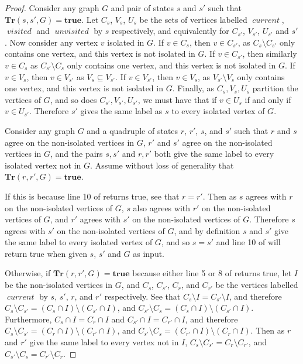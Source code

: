 \documentclass[a4paper,UKenglish,cleveref, autoref, thm-restate]{lipics-v2021} %
\DeclareMathOperator{\visited}{\textit{visited}}
\DeclareMathOperator{\unvisited}{\textit{unvisited}}
\DeclareMathOperator{\current}{\textit{current}}
\begin{document}
\begin{toappendix}
\begin{proof}
    Consider any graph $G$ and pair of states $s$ and $s'$ such that $\textbf{Tr}(s, s', G)=\textbf{true}$. Let $C_s$, $V_s$, $U_s$ be the sets of vertices labelled $\current$, $\visited$ and $\unvisited$ by $s$ respectively, and equivalently for $C_{s'}$, $V_{s'}$, $U_{s'}$ and $s'$. Now consider any vertex $v$ isolated in $G$. If $v \in C_s$, then $v \in C_{s'}$, as $C_s \setminus C_{s'}$ only contains one vertex, and this vertex is not isolated in $G$. If $v \in C_{s'}$, then similarly $v \in C_s$ as $C_{s'} \setminus C_s$ only contains one vertex, and this vertex is not isolated in $G$. If $v \in V_s$, then $v \in V_{s'}$ as $V_s \subseteq V_{s'}$. If $v \in V_{s'}$, then $v \in V_s$, as $V_{s'} \setminus V_s$ only contains one vertex, and this vertex is not isolated in $G$. Finally, as $C_s, V_s, U_s$ partition the vertices of $G$, and so does $C_{s'}, V_{s'}, U_{s'}$, we must have that if $v \in U_s$ if and only if $v \in U_{s'}$. Therefore $s'$ gives the same label as $s$ to every isolated vertex of $G$.

    Consider any graph $G$ and a quadruple of states $r$, $r'$, $s$, and $s'$ such that $r$ and $s$ agree on the non-isolated vertices in $G$, $r'$ and $s'$ agree on the non-isolated vertices in $G$, and the pairs $s,s'$ and $r,r'$ both give the same label to every isolated vertex not in $G$. Assume without loss of generality that $\textbf{Tr}(r, r', G)=\textbf{true}$.
    
    If this is because line 10 of  returns true, see that $r=r'$. Then as $s$ agrees with $r$ on the non-isolated vertices of $G$, $s$ also agrees with $r'$ on the non-isolated vertices of $G$, and $r'$ agrees with $s'$ on the non-isolated vertices of $G$. Therefore $s$ agrees with $s'$ on the non-isolated vertices of $G$, and by definition $s$ and $s'$ give the same label to every isolated vertex of $G$, and so $s=s'$ and line 10 of  will return true when given $s$, $s'$ and $G$ as input.
    
    Otherwise, if $\textbf{Tr}(r, r', G)=\textbf{true}$ because either line 5 or 8 of  returns true, let $I$ be the non-isolated vertices in $G$, and $C_s$, $C_{s'}$, $C_r$, and $C_{r'}$ be the vertices labelled $\current$ by $s$, $s'$, $r$, and $r'$ respectively. See that $C_s \setminus I = C_{s'} \setminus I$, and therefore $C_s \setminus C_{s'} = (C_s \cap I) \setminus (C_{s'} \cap I)$, and $C_{s'} \setminus C_s = (C_s \cap I) \setminus (C_{s'} \cap I)$. Furthermore, $C_s \cap I = C_r \cap I$ and $C_{s'} \cap I = C_{r'} \cap I$, and therefore $C_s \setminus C_{s'} = (C_r \cap I) \setminus (C_{r'} \cap I)$, and $C_{s'} \setminus C_{s} = (C_{r'} \cap I) \setminus (C_{r} \cap I)$. Then as $r$ and $r'$ give the same label to every vertex not in $I$, $C_s \setminus C_{s'} = C_r \setminus C_{r'}$, and $C_{s'} \setminus C_s = C_{r'} \setminus C_r$.


\end{proof}
\end{toappendix}
\end{document}
